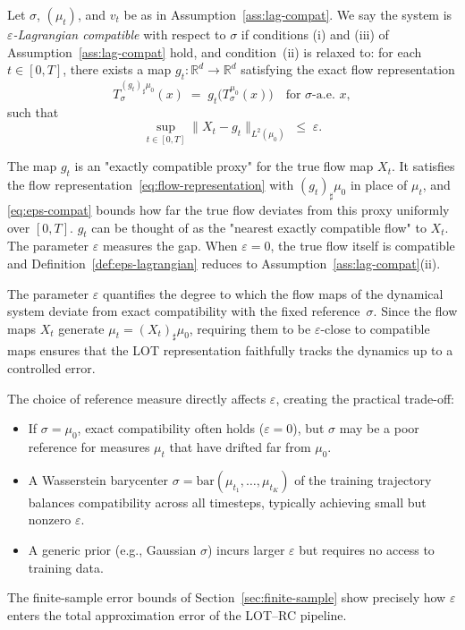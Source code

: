 \documentclass[11pt]{article}
\newcommand{\R}{\mathbb{R}}
\newcommand{\1}{\mathbf{1}}
\begin{document}
\begin{definition}
\label{def:eps-lagrangian}
Let $\sigma$, $(\mu_t)$, and $v_t$ be as in
Assumption~\ref{ass:lag-compat}. We say the system is
\emph{$\varepsilon$-Lagrangian compatible} with respect to $\sigma$ if
conditions (i) and (iii) of Assumption~\ref{ass:lag-compat} hold, and
condition~(ii) is relaxed to: for each $t \in [0,T]$, there exists a map
$g_t \colon \R^d \to \R^d$ satisfying the exact flow representation
\begin{equation}\label{eq:exact-compat-g}
  T_\sigma^{(g_t)_\sharp \mu_0}(x)
  \;=\; g_t\bigl(T_\sigma^{\mu_0}(x)\bigr)
  \quad \text{for } \sigma\text{-a.e.\ } x,
\end{equation}
such that
\begin{equation}\label{eq:eps-compat}
  \sup_{t \in [0,T]}
  \|X_t - g_t\|_{L^2(\mu_0)} \;\leq\; \varepsilon.
\end{equation}
\end{definition}

The map $g_t$ is an "exactly compatible proxy" for the true flow map $X_t$. It satisfies the flow representation~\eqref{eq:flow-representation} with $(g_t)_\sharp \mu_0$ in place of $\mu_t$, and \eqref{eq:eps-compat} bounds how far the true flow deviates from this proxy uniformly over $[0,T]$. $g_t$ can be thought of as the "nearest exactly compatible flow" to $X_t$. The parameter $\varepsilon$ measures the gap. When $\varepsilon = 0$, the true flow itself is compatible and Definition~\ref{def:eps-lagrangian} reduces to Assumption~\ref{ass:lag-compat}(ii).

\begin{remark}\label{rem:eps-interpretation}
The parameter $\varepsilon$ quantifies the degree to which the flow maps of the dynamical
system deviate from exact compatibility with the fixed reference~$\sigma$. Since the flow maps $X_t$ generate $\mu_t = (X_t)_\sharp \mu_0$, requiring them to be $\varepsilon$-close to compatible maps ensures that the LOT representation faithfully tracks the dynamics up to a controlled error.

The choice of reference measure directly affects $\varepsilon$, creating the practical trade-off:
\begin{itemize}
  \item If $\sigma = \mu_0$, exact compatibility often holds ($\varepsilon = 0$), but $\sigma$ may be a poor reference for measures $\mu_t$ that have drifted far from $\mu_0$.
  \item A Wasserstein barycenter $\sigma = \mathrm{bar}(\mu_{t_1}, \ldots, \mu_{t_K})$ of the   training trajectory balances compatibility across all timesteps, typically achieving small but nonzero $\varepsilon$.
  \item A generic prior (e.g., Gaussian $\sigma$) incurs larger $\varepsilon$ but requires no access to training data.
\end{itemize}
The finite-sample error bounds of Section~\ref{sec:finite-sample} show precisely how $\varepsilon$ enters the total approximation error of the LOT--RC pipeline.
\end{remark}
\end{document}
